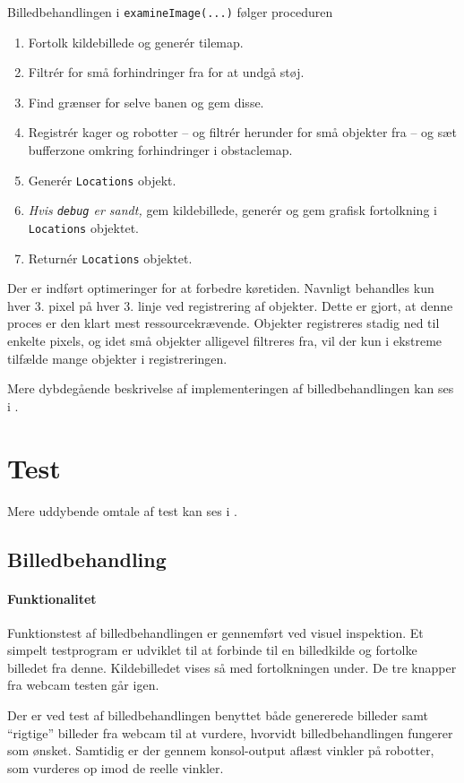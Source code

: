 Billedbehandlingen i \texttt{examineImage(...)} følger proceduren
\begin{enumerate}
	\item Fortolk kildebillede og generér tilemap.
	\item Filtrér for små forhindringer fra for at undgå støj.
	\item Find grænser for selve banen og gem disse.
	\item Registrér kager og robotter -- og filtrér herunder for små objekter fra -- og sæt bufferzone omkring forhindringer i obstaclemap.
	\item Generér \texttt{Locations} objekt.
	\item \textit{Hvis \texttt{debug} er sandt,} gem kildebillede, generér og gem grafisk fortolkning i \texttt{Locations} objektet.
	\item Returnér \texttt{Locations} objektet.
\end{enumerate}

Der er indført optimeringer for at forbedre køretiden. Navnligt behandles kun hver 3. pixel på hver 3. linje ved registrering af objekter. Dette er gjort, at denne proces er den klart mest ressourcekrævende. Objekter registreres stadig ned til enkelte pixels, og idet små objekter alligevel filtreres fra, vil der kun i ekstreme tilfælde mange objekter i registreringen.

Mere dybdegående beskrivelse af implementeringen af billedbehandlingen kan ses i .

\section{Test}
Mere uddybende omtale af test kan ses i .
\subsection{Billedbehandling}
\paragraph{Funktionalitet}
Funktionstest af billedbehandlingen er gennemført ved visuel inspektion. Et simpelt testprogram er udviklet til at forbinde til en billedkilde og fortolke billedet fra denne. Kildebilledet vises så med fortolkningen under. De tre knapper fra webcam testen går igen.

Der er ved test af billedbehandlingen benyttet både genererede billeder samt "`rigtige"' billeder fra webcam til at vurdere, hvorvidt billedbehandlingen fungerer som ønsket. Samtidig er der gennem konsol-output aflæst vinkler på robotter, som vurderes op imod de reelle vinkler.

